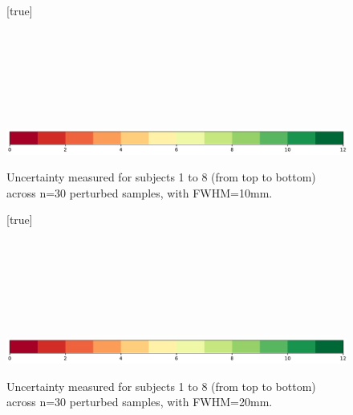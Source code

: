 \documentclass[lettersize,journal]{IEEEtran}
\begin{document}
\begin{landscape}
    \begin{figure}
        \vspace*{-2cm}
        \centering
        [true] \\
         \\
         \\
         \\
         \\
         \\
         \\
         \\
        \includegraphics*[width=.7\linewidth]{figures/colorbar_sigbit_discrete.pdf}
        \caption{Uncertainty measured for subjects 1 to 8 (from top to bottom) across n=30 perturbed samples, with FWHM=10mm. }
        \label{fig:uncertainty-maps-10mm-disc}
    \end{figure}
\end{landscape}

\begin{landscape}
    \begin{figure}
        \vspace*{-2cm}
        \centering
        [true] \\
         \\
         \\
         \\
         \\
         \\
         \\
         \\
        \includegraphics*[width=.7\linewidth]{figures/colorbar_sigbit_discrete.pdf}
        \caption{Uncertainty measured for subjects 1 to 8 (from top to bottom) across n=30 perturbed samples, with FWHM=20mm. }
        \label{fig:uncertainty-maps-20mm-disc}
    \end{figure}
\end{landscape}
\end{document}
